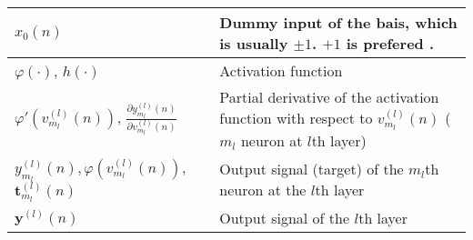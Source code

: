 \begin{xltabular}{\textwidth}{XX}
	\(x_0(n)\)                                                                                                                                                                     & Dummy input of the bais, which is usually \(\pm 1\). \(+1\) is prefered \cite{bishopPatternRecognitionMachine2006,haykinNeuralNetworksLearning2009}.                                                                                                                                                                                   \\ \hline
	\(\varphi(\cdot)\)\cite{haykinNeuralNetworksLearning2009}, \(h(\cdot)\)\cite{bishopPatternRecognitionMachine2006}                                                              & Activation function                                                                                                                                                                                                                                                                                                                    \\ \hline
	\(\varphi'(v_{m_l}^{(l)}(n))\)\cite{haykinNeuralNetworksLearning2009}, \(\frac{\partial y_{m_l}^{(l)}(n)}{\partial v_{m_l}^{(l)}(n)}\) \cite{haykinNeuralNetworksLearning2009} & Partial derivative of the activation function with respect to \(v_{m_l}^{(l)}(n)\) (\(m_l\) neuron at \(l\)th layer)                                                                                                                                                                                                                   \\ \hline
	\(y_{m_l}^{(l)}(n), \varphi \left( v_{m_l}^{(l)}(n) \right)\)\cite{haykinNeuralNetworksLearning2009}, \(\mathbf{t}_{m_l}^{(l)}(n)\)\cite{bishopPatternRecognitionMachine2006}                                                                                                                  & Output signal (target) of the \(m_l\)th neuron at the \(l\)th layer                                                                                                                                                                                                                                                                             \\ \hline
	\(\mathbf{y}^{(l)}(n)\)                                                                                                                                                        & Output signal of the \(l\)th layer                                                                                                                                                                                                                                                                                                     \\ \hline

\end{xltabular}
